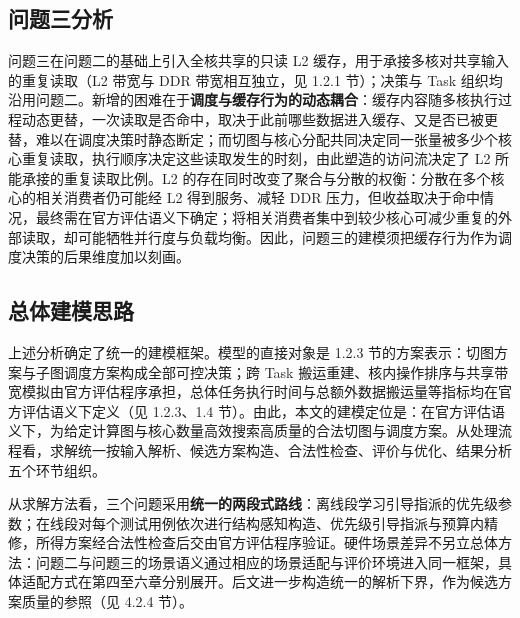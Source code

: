 \subsection{问题三分析}
问题三在问题二的基础上引入全核共享的只读 L2 缓存，用于承接多核对共享输入的重复读取（L2 带宽与 DDR 带宽相互独立，见 1.2.1 节）；决策与 Task 组织均沿用问题二。新增的困难在于\textbf{调度与缓存行为的动态耦合}：缓存内容随多核执行过程动态更替，一次读取是否命中，取决于此前哪些数据进入缓存、又是否已被更替，难以在调度决策时静态断定；而切图与核心分配共同决定同一张量被多少个核心重复读取，执行顺序决定这些读取发生的时刻，由此塑造的访问流决定了 L2 所能承接的重复读取比例。L2 的存在同时改变了聚合与分散的权衡：分散在多个核心的相关消费者仍可能经 L2 得到服务、减轻 DDR 压力，但收益取决于命中情况，最终需在官方评估语义下确定；将相关消费者集中到较少核心可减少重复的外部读取，却可能牺牲并行度与负载均衡。因此，问题三的建模须把缓存行为作为调度决策的后果维度加以刻画。

\subsection{总体建模思路}\label{sec:overall-approach}
上述分析确定了统一的建模框架。模型的直接对象是 1.2.3 节的方案表示：切图方案与子图调度方案构成全部可控决策；跨 Task 搬运重建、核内操作排序与共享带宽模拟由官方评估程序承担，总体任务执行时间与总额外数据搬运量等指标均在官方评估语义下定义（见 1.2.3、1.4 节）。由此，本文的建模定位是：在官方评估语义下，为给定计算图与核心数量高效搜索高质量的合法切图与调度方案。从处理流程看，求解统一按输入解析、候选方案构造、合法性检查、评价与优化、结果分析五个环节组织。

从求解方法看，三个问题采用\textbf{统一的两段式路线}：离线段学习引导指派的优先级参数；在线段对每个测试用例依次进行结构感知构造、优先级引导指派与预算内精修，所得方案经合法性检查后交由官方评估程序验证。硬件场景差异不另立总体方法：问题二与问题三的场景语义通过相应的场景适配与评价环境进入同一框架，具体适配方式在第四至六章分别展开。后文进一步构造统一的解析下界，作为候选方案质量的参照（见 4.2.4 节）。
